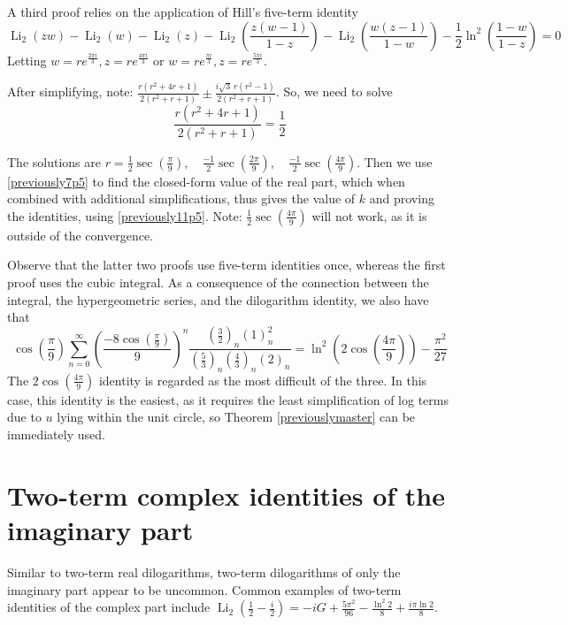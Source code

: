 \documentclass[12pt]{article}
\begin{document}
 A third proof relies on the application of Hill's five-term identity 
\begin{equation*}
\operatorname{Li}_2(zw) - \operatorname{Li}_2(w) - \operatorname{Li}_2(z) - \operatorname{Li}_2\left(\frac{z(w - 1)}{1 - z}\right) - \operatorname{Li}_2\left(\frac{w(z - 1)}{1 - w}\right) - \frac{1}{2} \ln^2\left(\frac{1 - w}{1 - z}\right) = 0
\end{equation*}
 Letting $w=r e^{\frac{2\pi i}{3}},z=r e^{\frac{4\pi i}{3}}$ or $w=r e^{\frac{\pi i}{3}},z=r e^{\frac{5\pi i}{3}}$. 

 After simplifying, note: $\frac{r (r^2 + 4r + 1)}{2 (r^2 + r + 1)} \pm \frac{i \sqrt{3} \, r (r^2 - 1)}{2 (r^2 + r + 1)}$. 
 So, we need to solve 
\begin{equation*}
 \frac{r (r^2 + 4r + 1)}{2 (r^2 + r + 1)} = \frac{1}{2}
\end{equation*}

 The solutions are $r=\frac{1}{2} \sec\left(\frac{\pi}{9}\right), \quad \frac{-1}{2} \sec\left(\frac{2\pi}{9}\right), \quad 
 \frac{-1}{2} \sec\left(\frac{4\pi}{9}\right)$. Then we use \eqref{previously7p5} to find the closed-form value of the real part, which when 
 combined with additional simplifications, thus gives the value of $k$ and proving the identities, using \eqref{previously11p5}. 
 Note: $\frac{1}{2} \sec\left(\frac{4\pi}{9}\right)$ will not work, as it is outside of the convergence. 

 Observe that the
 latter two proofs use five-term identities once, whereas the first proof uses the 
 cubic integral. As a consequence of the connection between the integral, the hypergeometric series, and the dilogarithm identity, 
 we also have that 
\begin{equation*}
 \cos\left(\frac{\pi}{9}\right) \sum_{n=0}^{\infty} \left( \frac{-8\cos\left(\frac{\pi}{9}\right)}{9} \right)^n 
 \frac{ \left( \frac{3}{2} \right)_n (1)_n^2 }{ \left( \frac{5}{3} \right)_n \left( \frac{4}{3} \right)_n 
 (2)_n } = \ln^2\left(2 \cos\left(\frac{4\pi}{9}\right)\right) - \frac{\pi^2}{27} 
 \end{equation*} 
 The $2\cos(\frac{4\pi}{9})$ identity is regarded as the most difficult of the three. In this case, this identity is the easiest, as it requires the 
 least simplification of log terms due to $u$ lying within the unit circle, so Theorem \ref{previouslymaster} can be immediately used. 

 \section{Two-term complex identities of the imaginary part} 
 Similar to two-term real dilogarithms, two-term dilogarithms of only the imaginary part appear to be uncommon. Common examples 
 of two-term identities of the complex part include 
 $\operatorname{Li}_2\left(\frac{1}{2} - \frac{i}{2}\right) = -i G + \frac{5\pi^2}{96} - \frac{\ln^2 2}{8} + \frac{i \pi \ln 2}{8}$. 
\end{document}
